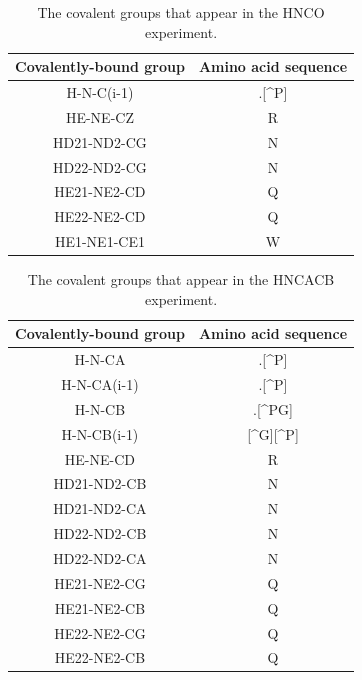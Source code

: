 \begin{table}
  \begin{tabular}{ | c | c | }
    \hline
    Covalently-bound group       &  Amino acid sequence  \\  \hline
    H-N-C(i-1)                   &  .[\^{}P]             \\  \hline
    HE-NE-CZ                     &  R                    \\  \hline
    HD21-ND2-CG                  &  N                    \\  \hline
    HD22-ND2-CG                  &  N                    \\  \hline
    HE21-NE2-CD                  &  Q                    \\  \hline
    HE22-NE2-CD                  &  Q                    \\  \hline
    HE1-NE1-CE1                  &  W                    \\  \hline
  \end{tabular}
  \caption{The covalent groups that appear in the HNCO experiment.}
  \label{hnco_peaktypes}
\end{table}
    
\begin{table}
  \begin{tabular}{ | c | c | }
    \hline
    Covalently-bound group       &  Amino acid sequence  \\  \hline
    H-N-CA                       &  .[\^{}P]             \\  \hline
    H-N-CA(i-1)                  &  .[\^{}P]             \\  \hline
    H-N-CB                       &  .[\^{}PG]            \\  \hline
    H-N-CB(i-1)                  &  [\^{}G][\^{}P]       \\  \hline
    HE-NE-CD                     &  R                    \\  \hline
    HD21-ND2-CB                  &  N                    \\  \hline
    HD21-ND2-CA                  &  N                    \\  \hline
    HD22-ND2-CB                  &  N                    \\  \hline
    HD22-ND2-CA                  &  N                    \\  \hline
    HE21-NE2-CG                  &  Q                    \\  \hline
    HE21-NE2-CB                  &  Q                    \\  \hline
    HE22-NE2-CG                  &  Q                    \\  \hline
    HE22-NE2-CB                  &  Q                    \\  \hline
  \end{tabular}
  \caption{The covalent groups that appear in the HNCACB experiment.}
  \label{hncacb_peaktypes}
\end{table}

